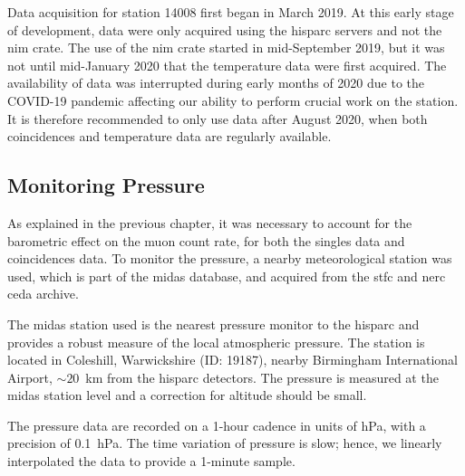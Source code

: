 
Data acquisition for station 14008 first began in March 2019. At this early stage of development, data were only acquired using the \gls{hisparc} servers and not the \gls{nim} crate. The use of the \gls{nim} crate started in mid-September 2019, but it was not until mid-January 2020 that the temperature data were first acquired. The availability of data was interrupted during early months of 2020 due to the COVID-19 pandemic affecting our ability to perform crucial work on the station. It is therefore recommended to only use data after August 2020, when both coincidences and temperature data are regularly available.%



\subsection{Monitoring Pressure}

As explained in the previous chapter, it was necessary to account for the barometric effect on the muon count rate, for both the singles data and coincidences data. To monitor the pressure, a nearby meteorological station was used, which is part of the \gls{midas} database, and acquired from the \gls{stfc} and \gls{nerc} \gls{ceda} archive.

The \gls{midas} station used is the nearest pressure monitor to the \gls{hisparc} and provides a robust measure of the local atmospheric pressure. The station is located in Coleshill, Warwickshire (ID: 19187), nearby Birmingham International Airport, $\sim 20$~km from the \gls{hisparc} detectors. The pressure is measured at the \gls{midas} station level and a correction for altitude should be small. 

The pressure data are recorded on a 1-hour cadence in units of hPa, with a precision of 0.1~hPa. The time variation of pressure is slow; hence, we linearly interpolated the data to provide a 1-minute sample.


